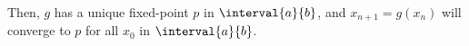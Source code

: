 \documentclass{article}
\begin{document}
\begin{minipage}[t]{126.1962963mm}
    Then, \(g\) has a unique fixed-point \(p\) in \(\interval{a}{b}\), and \(x_{n+1} = g\left( x_n \right)\)
    will converge to \(p\) for all \(x_0\) in \(\interval{a}{b}\).
\end{minipage}
\end{document}
